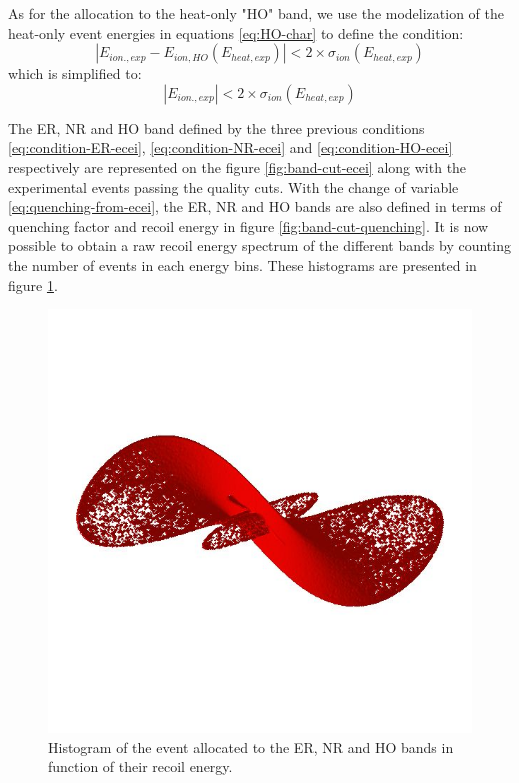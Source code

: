 As for the allocation to the heat-only "HO" band, we use the modelization of the heat-only event energies in equations \ref{eq:HO-char} to define the condition:
\begin{equation}
|E_{ion., exp} - E_{ion, HO}(E_{heat, exp})| < 2 \times \sigma_{ion}\left( E_{heat, exp}\right)
\end{equation}
which is simplified to:
\begin{equation}
\label{eq:condition-HO-ecei}
|E_{ion., exp}| < 2 \times \sigma_{ion}\left( E_{heat, exp}\right)
\end{equation}

The ER, NR and HO band defined by the three previous conditions \ref{eq:condition-ER-ecei}, \ref{eq:condition-NR-ecei} and \ref{eq:condition-HO-ecei} respectively are represented on the figure \ref{fig:band-cut-ecei} along with the experimental events passing the quality cuts. With the change of variable \ref{eq:quenching-from-ecei}, the ER, NR and HO bands are also defined in terms of quenching factor and recoil energy in figure \ref{fig:band-cut-quenching}. 
It is now possible to obtain a raw recoil energy spectrum of the different bands by counting the number of events in each energy bins. These histograms are presented in figure \ref{fig:raw-hist}.

\begin{figure}
\centering
\includegraphics[width=\linewidth,]{Figures/placeholder}
\caption{Histogram of the event allocated to the ER, NR and HO bands in function of their recoil energy.}
\label{fig:raw-hist}
\end{figure}

